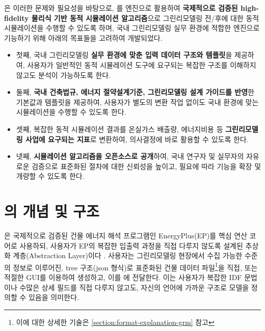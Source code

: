 \simulator 은 이러한 문제와 필요성을 바탕으로, \ep 를 엔진으로 활용하여 \textbf{국제적으로 검증된 high-fidelity 물리식 기반 동적 시뮬레이션 알고리즘}으로 그린리모델링 전/후에 대한 동적 시뮬레이션을 수행할 수 있도록 하며, 국내 그린리모델링 실무 환경에 적합한 엔진으로 기능하기 위해 아래의 목표들을 고려하여 개발되었다.

\begin{itemize}
  \item 첫째, 국내 그린리모델링 \textbf{실무 환경에 맞춘 입력 데이터 구조와 템플릿}을 제공하여, 사용자가 일반적인 동적 시뮬레이션 도구에 요구되는 복잡한  구조를 이해하지 않고도 분석이 가능하도록 한다.
  \item 둘째, \textbf{국내 건축법규, 에너지 절약설계기준, 그린리모델링 설계 가이드를 반영}한 기본값과 템플릿을 제공하여, 사용자가 별도의 변환 작업 없이도 국내 환경에 맞는 시뮬레이션을 수행할 수 있도록 한다.
  \item 셋째, 복잡한 동적 시뮬레이션 결과를 온실가스 배출량, 에너지비용 등 \textbf{그린리모델링 사업에 요구되는 지표}로 변환하여, 의사결정에 바로 활용할 수 있도록 한다.
  \item 넷째, \textbf{시뮬레이션 알고리즘을 오픈소스로 공개}하여, 국내 연구자 및 실무자의 자유로운 검증으로 표준화된 절차에 대한 신뢰성을 높이고, 필요에 따라 기능을 확장 및 개량할 수 있도록 한다.
\end{itemize}


\section{\simulator 의 개념 및 구조}

\simulator 은 국제적으로 검증된 건물 에너지 해석 프로그램인 EnergyPlus(EP)를 핵심 연산 코어로 사용하되, 사용자가 EP의 복잡한 입출력 과정을 직접 다루지 않도록 설계된 추상화 계층(Abstraction Layer)이다 .
사용자는 그린리모델링 현장에서 수집 가능한 수준의 정보로 이루어진, tree 구조(json 형식)로 표준화된 건물 데이터 파일\footnote{이에 대한 상세한 기술은 \ref{section:format-explanation-grm} 참고}을 직접, 또는 적절한 GUI를 이용하여 생성하고, 이를 \simulator 에 전달한다.
이는 사용자가 복잡한 IDF 문법이나 수많은 상세 필드를 직접 다루지 않고도, 자신의 언어에 가까운 구조로 모델을 정의할 수 있음을 의미한다.

